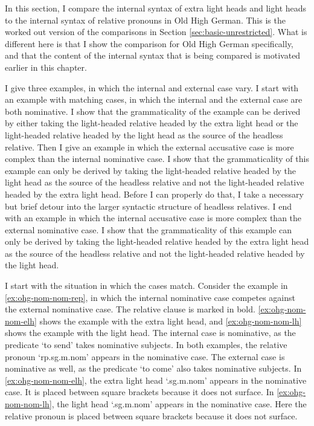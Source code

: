 In this section, I compare the internal syntax of extra light heads and light heads to the internal syntax of relative pronouns in Old High German. This is the worked out version of the comparisons in Section \ref{sec:basic-unrestricted}. What is different here is that I show the comparison for Old High German specifically, and that the content of the internal syntax that is being compared is motivated earlier in this chapter.

I give three examples, in which the internal and external case vary.
I start with an example with matching cases, in which the internal and the external case are both nominative. I show that the grammaticality of the example can be derived by either taking the light-headed relative headed by the extra light head or the light-headed relative headed by the light head as the source of the headless relative.
Then I give an example in which the external accusative case is more complex than the internal nominative case. I show that the grammaticality of this example can only be derived by taking the light-headed relative headed by the light head as the source of the headless relative and not the light-headed relative headed by the extra light head. Before I can properly do that, I take a necessary but brief detour into the larger syntactic structure of headless relatives.
I end with an example in which the internal accusative case is more complex than the external nominative case. I show that the grammaticality of this example can only be derived by taking the light-headed relative headed by the extra light head as the source of the headless relative and not the light-headed relative headed by the light head.

I start with the situation in which the cases match.
Consider the example in \ref{ex:ohg-nom-nom-rep}, in which the internal nominative case competes against the external nominative case. The relative clause is marked in bold. \ref{ex:ohg-nom-nom-elh} shows the example with the extra light head, and \ref{ex:ohg-nom-nom-lh} shows the example with the light head.
The internal case is nominative, as the predicate  `to send' takes nominative subjects.
In both examples, the relative pronoun  `\ac{rp}.\ac{sg}.\ac{m}.\ac{nom}' appears in the nominative case.
The external case is nominative as well, as the predicate  `to come' also takes nominative subjects.
In \ref{ex:ohg-nom-nom-elh}, the extra light head  `.\ac{sg}.\ac{m}.\ac{nom}' appears in the nominative case. It is placed between square brackets because it does not surface.
In \ref{ex:ohg-nom-nom-lh}, the light head  `.\ac{sg}.\ac{m}.\ac{nom}' appears in the nominative case. Here the relative pronoun is placed between square brackets because it does not surface.

